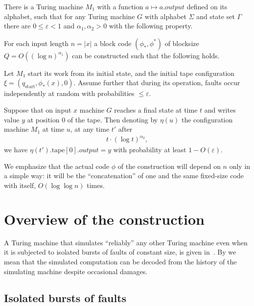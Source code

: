 \documentclass[12pt]{memoir}
\newcommand{\Output}{\mathit{output}}
\newcommand{\start}{\mathrm{start}}
\newcommand{\tape}{\mathrm{tape}}
\begin{document}
\begin{theorem}\label{thm:main-main}
There is a Turing machine \( M_{1} \) with a 
function \( a\mapsto a.\Output \) defined on its alphabet, 
such that
for any Turing machine \( G \) with alphabet \( \Sigma \) and state set \( \Gamma \)
there are \( 0\le\varepsilon <1 \) and \( \alpha_{1},\alpha_{2}>0 \) 
with the following property.

For each input length \( n=|x| \) a block code
\( (\phi_*, \phi^*) \) of blocksize \( Q=O((\log n)^{\alpha_{1}}) \) can be constructed 
such that the following holds.

Let \( M_1 \) start its work from its initial state,
and the initial tape configuration \( \xi=(q_{\start},\phi_{*}(x),0) \).
Assume further that
during its operation, faults occur independently at random
with probabilities \( \le \varepsilon \).

Suppose that on input \( x \) machine \( G \) reaches a final state at time \( t \) and writes
value \( y \) at position 0 of the tape.
Then denoting by \( \eta(u) \) the configuration machine \( M_{1} \) at time \( u \),
at any time \( t' \) after
 \begin{align*}
   t\cdot (\log t)^{\alpha_{2}},
 \end{align*}
we have \( \eta(t').\tape[0].\Output= y \)
with probability at least \( 1 - O(\varepsilon) \).
\end{theorem}

We emphasize that the actual
code \( \phi \) of the construction will depend on \( n \) only in a simple way:
it will be the ``concatenation'' of one and the same fixed-size
code with itself, \( O(\log\log n) \) times.


\section{Overview of the construction}

A Turing machine that simulates ``reliably'' any other
Turing machine even when it is subjected to isolated bursts of faults of constant size,
is given in~\cite{burstyTuring12Conf}.
By  we mean that the 
simulated computation can be decoded from the history
of the simulating machine despite occasional damages.


\subsection{Isolated bursts of faults}\label{sec:bursts}
\end{document}
